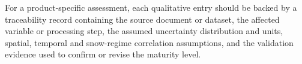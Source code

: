 For a product-specific assessment, each qualitative entry should be backed by a traceability record containing the source document or dataset, the affected variable or processing step, the assumed uncertainty distribution and units, spatial, temporal and snow-regime correlation assumptions, and the validation evidence used to confirm or revise the maturity level.






